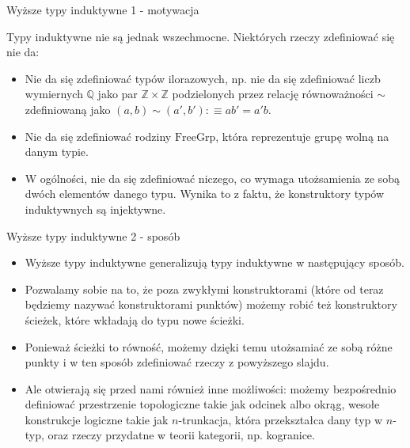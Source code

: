 \documentclass{beamer}
\newcommand{\defn}{:\equiv}
\begin{document}
\begin{frame}{Wyższe typy induktywne 1 - motywacja}

Typy induktywne nie są jednak wszechmocne. Niektórych rzeczy zdefiniować się nie da:
\begin{itemize}
	\item Nie da się zdefiniować typów ilorazowych, np. nie da się zdefiniować liczb wymiernych $\mathbb{Q}$ jako par $\mathbb{Z} \times \mathbb{Z}$ podzielonych przez relację równoważności $\sim$ zdefiniowaną jako $(a, b) \sim (a', b') \defn ab' = a'b$.
	\item Nie da się zdefiniować rodziny $\text{FreeGrp}$, która reprezentuje grupę wolną na danym typie.
	\item W ogólności, nie da się zdefiniować niczego, co wymaga utożsamienia ze sobą dwóch elementów danego typu. Wynika to z faktu, że konstruktory typów induktywnych są injektywne.
\end{itemize}
\end{frame}

\begin{frame}{Wyższe typy induktywne 2 - sposób}
\begin{itemize}
	\item Wyższe typy induktywne generalizują typy induktywne w następujący sposób.
	\item Pozwalamy sobie na to, że poza zwykłymi konstruktorami (które od teraz będziemy nazywać konstruktorami punktów) możemy robić też konstruktory ścieżek, które wkładają do typu nowe ścieżki.
	\item Ponieważ ścieżki to równość, możemy dzięki temu utożsamiać ze sobą różne punkty i w ten sposób zdefiniować rzeczy z powyższego slajdu.
	\item Ale otwierają się przed nami również inne możliwości: możemy bezpośrednio definiować przestrzenie topologiczne takie jak odcinek albo okrąg, wesołe konstrukcje logiczne takie jak $n$-trunkacja, która przekształca dany typ w $n$-typ, oraz rzeczy przydatne w teorii kategorii, np. kogranice.
\end{itemize}
\end{frame}
\end{document}
